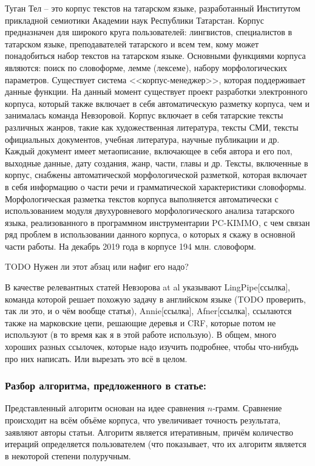 Туган Тел -- это корпус текстов на татарском языке, разработанный Институтом прикладной
семиотики Академии наук Республики Татарстан. Корпус предназначен для широкого круга 
пользователей: лингвистов, специалистов в татарском языке, преподавателей татарского и всем 
тем, кому может понадобиться набор текстов на татарском языке. Основными функциями корпуса 
являются: поиск  по словоформе, лемме (лексеме), набору морфологических параметров. 
Существует система <<корпус-менеджер>>, которая поддерживает данные функции.  На данный 
момент существует проект разработки электронного корпуса, который также включает в себя 
автоматическую разметку корпуса, чем и занималась команда Невзоровой. Корпус включает в 
себя татарские тексты различных жанров, такие как художественная литература, тексты СМИ, 
тексты официальных документов, учебная литература, научные публикации и др. Каждый
документ имеет метаописание, включающее в себя автора и его пол, выходные данные, дату 
создания, жанр, части, главы и др. Тексты, включенные в корпус, снабжены автоматической 
морфологической разметкой, которая включает в себя информацию о части речи и 
грамматической характеристики словоформы. Морфологическая разметка текстов корпуса 
выполняется автоматически с использованием модуля двухуровневого морфологического анализа 
татарского языка, реализованного в программном инструментарии PC-KIMMO, с чем связан ряд 
проблем в использовании данного корпуса, о которых я скажу в основной части работы. На 
декабрь 2019 года в корпусе 194 млн. словоформ. 

TODO Нужен ли этот абзац или нафиг его надо?

В качестве релевантных статей Невзорова at al указывают LingPipe[ссылка], команда которой 
решает похожую задачу в английском языке (TODO проверить, так ли это, и о чём вообще статья), 
Annie[ссылка], Afner[ссылка], ссылаются также на марковские цепи, решающие деревья и CRF,
которые потом не используют (в то время как я в этой работе использую). В общем, много хороших 
разных ссылочек, которые надо изучить подробнее, чтобы что-нибудь про них написать. Или вырезать это всё в целом.

\subsubsection{Разбор алгоритма, предложенного в статье:}

Представленный алгоритм основан на идее сравнения $n$-грамм. Сравнение происходит на всём 
объёме корпуса, что увеличивает точность результата, заявляют авторы статьи. Алгоритм является итеративным, причём количество итераций определяется пользователем (что показывает, что их алгоритм является в некоторой степени полуручным.

